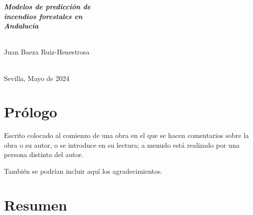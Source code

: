 \documentclass[12pt,a4paper,]{book}
\def\ifdoblecara{} %
\numberwithin{dummy}{section}
\theoremstyle{ocrenumbox}
\theoremstyle{blacknumex}
\theoremstyle{blacknumbox}
\theoremstyle{ocrenum}
\theoremstyle{ocrenum}
\begin{document}
\begin{titlepage}
\begin{minipage}{14cm}
{\Huge
\textbf{\textit{
Modelos de predicción de\\[0.2cm]
incendios forestales en\\[0.35cm]
Andalucía
}}}\\[0.75cm] 

\HRule \\[4cm]


{\Large

Juan Baeza Ruiz-Henestrosa} \\[0.5cm]

{\large
Sevilla, Mayo de 2024
}

\end{minipage}

\vfill %

\cleardoublepage
\thispagestyle{empty}
\end{titlepage}

\raggedbottom




\setlength{\parindent}{1em}

\pagestyle{fancy}
\ifdefined\ifdoblecara
\fancyhead[LE,RO]{}
\fancyhead[LO,RE]{}
\else
\fancyhead[RO]{}
\fancyhead[LO]{}
\fi
\renewcommand{\headrulewidth}{0pt}
\renewcommand{\footrulewidth}{0pt}

\setcounter{tocdepth}{4}
\tableofcontents

\cleardoublepage

\section*{Prólogo}


Escrito colocado al comienzo de una obra en el que se hacen comentarios
sobre la obra o su autor, o se introduce en su lectura; a menudo está
realizado por una persona distinta del autor.

También se podrían incluir aquí los agradecimientos.

\cleardoublepage

\section*{Resumen}
\end{document}
